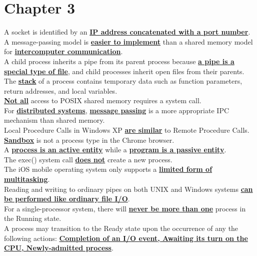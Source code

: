 \documentclass[10pt]{article}
\newcommand{\qw}[1]{\textbf{\ul{#1}}}
\begin{document}
\section*{\centering Chapter 3}
A socket is identified by an \qw{IP address concatenated with a port number}.\\[2mm]
A message-passing model is \qw{easier to implement} than a shared memory model for \qw{intercomputer communication}.\\[2mm]
A child process inherits a pipe from its parent process because \qw{a pipe is a special type of file}, and child processes inherit open files from their parents.\\[2mm]
The \qw{stack} of a process contains temporary data such as function parameters, return addresses, and local variables.\\[2mm]
\qw{Not all} access to POSIX shared memory requires a system call.\\[2mm]
For \qw{distributed systems}, \qw{message passing} is a more appropriate IPC mechanism than shared memory.\\[2mm]
Local Procedure Calls in Windows XP \qw{are similar} to Remote Procedure Calls.\\[2mm]
\qw{Sandbox} is not a process type in the Chrome browser.\\[2mm]
A \qw{process is an active entity} while a \qw{program is a passive entity}.\\[2mm]
The exec() system call \qw{does not} create a new process.\\[2mm]
The iOS mobile operating system only supports a \qw{limited form of multitasking}.\\[2mm]
Reading and writing to ordinary pipes on both UNIX and Windows systems \qw{can be performed like ordinary file I/O}.\\[2mm]
For a single-processor system, there will \qw{never be more than one} process in the Running state.\\[2mm]
A process may transition to the Ready state upon the occurrence of any the following actions:
\qw{Completion of an I/O event, Awaiting its turn on the CPU, Newly-admitted process}.
\end{document}
